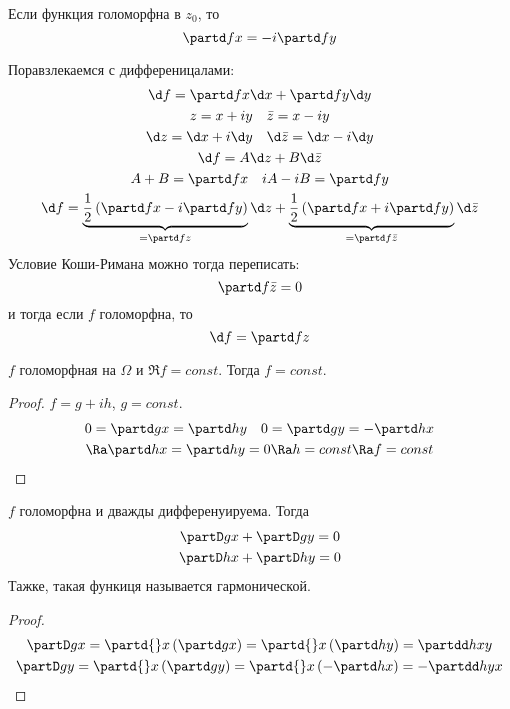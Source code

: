 \begin{assertion}
	Если функция голоморфна в $z_0$, то
	\[ \partd fx = -i \partd fy \]
\end{assertion}

Поравзлекаемся с дифференицалами:
\begin{gather*}
	\d f = \partd fx \d x + \partd fy \d y \\
	z = x + iy \quad \bar z = x - iy\\
	\d z = \d x + i \d y \quad \d \bar z = \d x - i \d y \\
	\d f = A \d z + B \d \bar z \\
	A + B = \partd fx \quad iA - iB = \partd fy \\
	\d f
	= \underbrace{\frac12 \left( \partd fx - i \partd fy \right)}_{=\partd fz} \d z
	+ \underbrace{\frac12 \left( \partd fx + i \partd fy \right)}_{=\partd f{\bar z}} \d \bar z
\end{gather*}
Условие Коши-Римана можно тогда переписать:
\[ \partd f{\bar z} = 0 \]
и тогда если $f$ голоморфна, то
\[ \d f = \partd fz \]

\begin{conseq*}
	$f$ голоморфная на $\Omega$ и $\Re f = const$.
	Тогда $f = const$.
\end{conseq*}
\begin{proof}
	$f = g + ih$, $g = const$.
	\begin{gather*}
		0 = \partd gx = \partd hy \quad 0 = \partd gy = -\partd hx \\
		\Ra \partd hx = \partd hy = 0 \Ra h = const \Ra f = const
	\end{gather*}
\end{proof}

\begin{conseq*}
	$f$ голоморфна и дважды дифференуируема.
	Тогда
	\begin{gather*}
		\partD gx + \partD gy = 0 \\
		\partD hx + \partD hy = 0 \\
	\end{gather*}
	Тажке, такая функиця называется гармонической.
\end{conseq*}
\begin{proof}
	\begin{gather*}
		\partD gx = \partd{}x\left( \partd gx \right) = \partd{}x\left( \partd hy \right) = \partdd hxy \\
		\partD gy = \partd{}x\left( \partd gy \right) = \partd{}x\left( -\partd hx \right) = -\partdd hyx
	\end{gather*}
\end{proof}


